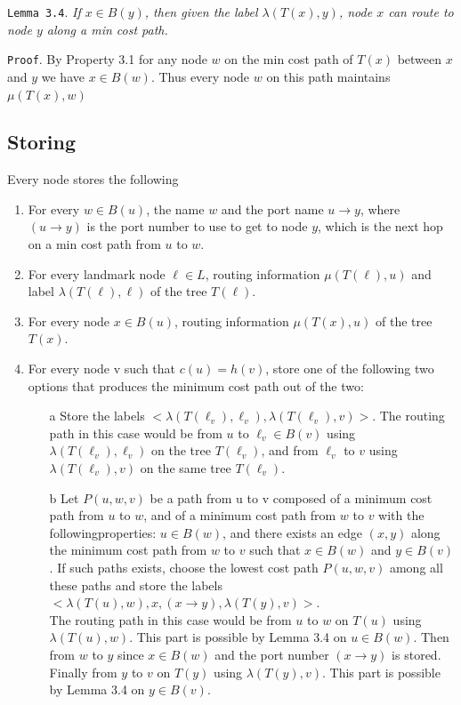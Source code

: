 \texttt{Lemma 3.4}. \textit{If $x\in B(y)$, then given the label $\lambda(T(x),y)$, node $x$ can route to node $y$ along a min cost path.}

\texttt{Proof}. By Property 3.1 for any node $w$ on the min cost path of $T(x)$ between $x$ and $y$ we have $x\in B(w)$. Thus every node $w$ on this path maintains $\mu(T(x),w)$

\subsection{Storing}\label{subsec:storing}
Every node stores the following
\begin{enumerate}
    \item For every $w\in B(u)$, the name $w$ and the port name $u\rightarrow y$, where $(u\rightarrow y)$ is the port number to use to get to node $y$, which is the next hop on a min cost path from $u$ to $w$.
    \item For every landmark node $\ell \in L$, routing information $\mu(T(\ell),u)$ and label $\lambda(T(\ell),\ell)$ of the tree $T(\ell)$.
    \item For every node $x\in B(u)$, routing information $\mu(T(x),u)$ of the tree $T(x)$.
    \item For every node v such that $c(u) = h(v)$, store one of the following two options that produces the minimum cost path out of the two:
    \begin{enumerate}
        \item[a] Store the labels $<\lambda(T (\ell_v), \ell_v ), \lambda(T (\ell_v), v)>$. The routing path in this case would be from $u$ to $\ell_v \in B(v)$ using $\lambda(T (\ell_v), \ell_v)$ on the tree $T (\ell_v)$, and from $\ell_v$ to $v$ using $\lambda(T (\ell_v), v)$ on the same tree $T (\ell_v)$.

        \item[b] Let $P(u, w, v)$ be a path from u to v composed of a minimum cost path from $u$ to $w$, and of a minimum cost path from $w$ to $v$ with the followingproperties: $u \in B(w)$, and there exists an edge $(x, y)$ along the minimum cost path from $w$ to $v$ such that $x \in B(w)$ and $y \in B(v)$. If such paths exists, choose the lowest cost path $P(u, w, v)$ among all these paths and store the labels $<\lambda(T (u), w), x, (x \rightarrow y), \lambda(T (y), v)>$.\\
        The routing path in this case would be from $u$ to $w$ on $T(u)$ using $\lambda(T (u), w)$. This part is possible by Lemma 3.4 on $u \in B(w)$. Then from $w$ to $y$ since $x \in B(w)$ and the port number $(x \rightarrow y)$ is stored. Finally from $y$ to $v$ on $T(y)$ using $\lambda(T (y), v)$. This part is possible by Lemma 3.4 on $y \in B(v)$.
    \end{enumerate}
\end{enumerate}


